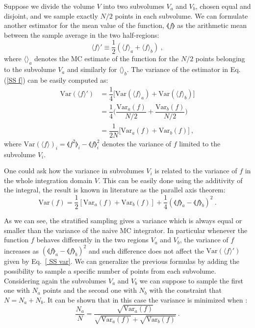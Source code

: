 \documentclass[../main/main.tex]{subfiles}
\begin{document}
Suppose we divide the volume $V$ into two subvolumes $V_a$  and $V_b$, chosen equal and disjoint, and we sample exactly $N/2$ points in each subvolume. We can formulate another estimator for the mean value of the function, $\llangle f \rrangle $ as the arithmetic mean between the sample average
in the two half-regions:
\begin{equation}
	\label {SS f}
	\langle f  \rangle ' \equiv \frac{1}{2} (  \langle f \rangle_a + \langle f \rangle_b ) \ ,
\end{equation}
where $\langle \rangle_a$ denotes the MC estimate of the function for the $N/2$ points belonging to the subvolume $V_a$ and similarly for $\langle \rangle_b$.
The variance of the estimator in Eq.(\ref{SS f}) can be easily computed as:
\begin{eqnarray}
	\text{Var}(\langle f \rangle ') &= \dfrac{1}{4}  \big[  \text{Var}(\langle f \rangle_a) +\text{Var}(\langle f \rangle_b)  \big]  \\
	&= \dfrac{1}{4} \bigg(  \dfrac{\text{Var}_a(f)}{N/2} +\dfrac{\text{Var}_b(f)}{N/2} \bigg) \\
	&= \dfrac{1}{2N} \big[ \text{Var}_a(f) + \text{Var}_b(f)\big] \label{var_stratified} \ ,
	\label{ SS var}
\end{eqnarray}
where $\text{Var}(\langle f \rangle)_{i} = \llangle f^2 \rrangle_i - \llangle f \rrangle^2_i$ denotes the variance of $f$ limited to the subvolume $V_i$.

One could ask how the variance in subvolumes $V_i$ is related to the variance of $f$ in the whole integration domain $V$. This can be easily done using the additivity of the integral, the result is known in literature as the parallel axis theorem:
\begin{equation}
	\text{Var}(f) = \frac{1}{2} [ \text{Var}_a(f) + \text{Var}_b(f)] + \frac{1}{4} ( 
	\llangle f \rrangle_a - \llangle f \rrangle_b)^2 \ .
\end{equation}

As we can see, the stratified sampling gives a variance which is always equal or smaller than the variance of the naive MC integrator. In particular whenever the function $f$ behaves differently in 
the two regions $V_a$ and $V_b$, the variance of $f$ increases as $ ( 
\llangle f \rrangle_a - \llangle f \rrangle_b)^2$ and such difference does not affect the $\text{Var}(\langle f \rangle')$ given by Eq.~\ref{ SS var}.
\newline
We can generalize the previous formulas by adding the possibility to sample a specific number of 
points from each subvolume. Considering again the subvolumes $V_a$ and $V_b$ we can suppose 
to sample the first one with $N_a$ points and the second one with $N_b$ with the constraint that $N = N_a + N_b$. 
\newline
It can be shown that in this case the variance is minimized when \cite{Press:1989vk}:
\begin{equation}
	\frac{N_a}{N} = \frac{\sqrt{\text{Var}_a(f)}}{\sqrt{\text{Var}_a(f)}+
		\sqrt{\text{Var}_b(f)}} \ .
\end{equation}
\end{document}
